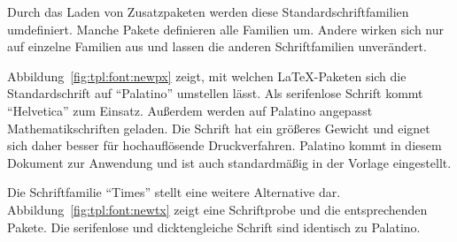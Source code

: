 Durch das Laden von Zusatzpaketen werden diese Standardschriftfamilien
umdefiniert. Manche Pakete definieren alle Familien um. Andere wirken sich nur
auf einzelne Familien aus und lassen die anderen Schriftfamilien unverändert.

Abbildung~\ref{fig:tpl:font:newpx} zeigt, mit welchen \LaTeX-Paketen sich die
Standardschrift auf "`Palatino"' umstellen lässt. Als serifenlose Schrift kommt
"`Helvetica"' zum Einsatz. Außerdem werden auf Palatino angepasst
Mathematikschriften geladen. Die Schrift hat ein größeres Gewicht und eignet
sich daher besser für hochauflösende Druckverfahren. Palatino kommt in diesem
Dokument zur Anwendung und ist auch standardmäßig in der Vorlage eingestellt.

Die Schriftfamilie "`Times"' stellt eine weitere Alternative dar.
Abbildung~\ref{fig:tpl:font:newtx} zeigt eine Schriftprobe und die entsprechenden
Pakete. Die serifenlose und dicktengleiche Schrift sind identisch zu Palatino.
